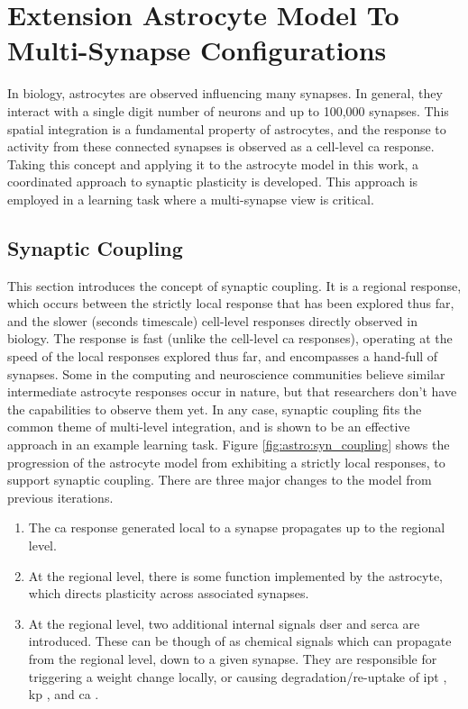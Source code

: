\documentclass[conference]{IEEEtran}
\newcommand{\ca}{\gls{ca}\textrm{ }}
\newcommand{\ipt}{\gls{ipt}\textrm{ }}
\newcommand{\kp}{\gls{kp}\textrm{ }}
\newcommand{\dser}{\gls{dser}\textrm{ }}
\newcommand{\serca}{\gls{serca}\textrm{ }}
\begin{document}
\section{Extension Astrocyte Model To Multi-Synapse Configurations}

In biology, astrocytes are observed influencing many synapses. In general, they
interact with a single digit number of neurons and up to 100,000 synapses. This
spatial integration is a fundamental property of astrocytes, and the response to
activity from these connected synapses is observed as a cell-level \ca
response. Taking this concept and applying it to the astrocyte model in this
work, a coordinated approach to synaptic plasticity is developed. This approach
is employed in a learning task where a multi-synapse view is critical.

\subsection{Synaptic Coupling}
This section introduces the concept of synaptic coupling. It is a regional
response, which occurs between the strictly local response that has been
explored thus far, and the slower (seconds timescale) cell-level responses
directly observed in biology. The response is fast (unlike the cell-level \ca
responses), operating at the speed of the local responses explored thus far, and
encompasses a hand-full of synapses. Some in the computing and neuroscience
communities believe similar intermediate astrocyte responses occur in nature,
but that researchers don't have the capabilities to observe them yet. In any
case, synaptic coupling fits the common theme of multi-level integration, and is
shown to be an effective approach in an example learning task. Figure
\ref{fig:astro:syn_coupling} shows the progression of the astrocyte model from
exhibiting a strictly local responses, to support synaptic coupling. There are
three major changes to the model from previous iterations.

\begin{enumerate}
\item The \ca response generated local to a synapse propagates up to the
  regional level.
\item At the regional level, there is some function implemented by the
  astrocyte, which directs plasticity across associated synapses.
\item At the regional level, two additional internal signals \dser and
  \serca are introduced. These can be though of as chemical signals which can
  propagate from the regional level, down to a given synapse. They are
  responsible for triggering a weight change locally, or causing
  degradation/re-uptake of \ipt, \kp, and \ca.
\end{enumerate}
\end{document}

